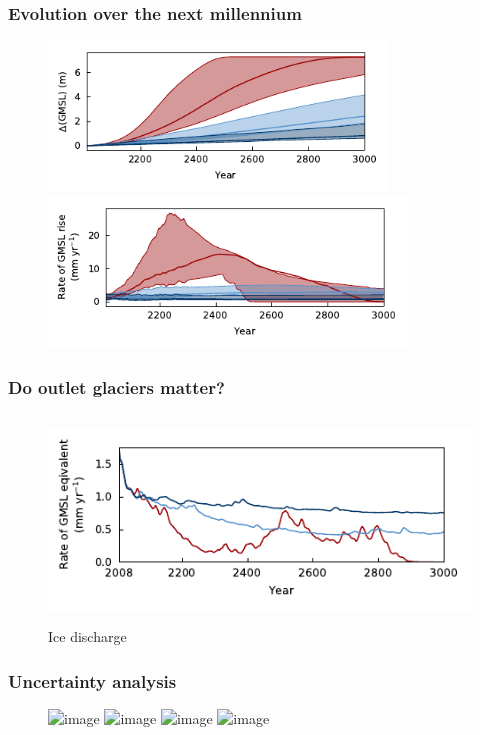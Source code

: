 \documentclass[hide notes,intlimits]{beamer}
\begin{document}
\begin{frame}
  \frametitle{Evolution over the next millennium}
  \begin{figure}
    \includegraphics[height=4cm]{les18_rcp_limnsw} \\
    \includegraphics[height=4cm]{les18_rcp_tendency_of_ice_mass_glacierized}
  \end{figure}
\end{frame}


\begin{frame}
  \frametitle{Do outlet glaciers matter?}
  \begin{figure}
    \includegraphics[height=5.5cm]{rcp_d_rcp_tendency_of_ice_mass_due_to_discharge}
    \caption{Ice discharge}
  \end{figure}
\end{frame}

\begin{frame}
  \frametitle{Uncertainty analysis}
  \begin{figure}
    \includegraphics<1>[height=6.5cm]{gcm_rcp_26_year_2100_les_pie}
    \includegraphics<2>[height=6.5cm]{gcm_rcp_26_year_2200_les_pie}
    \includegraphics<3>[height=6.5cm]{gcm_rcp_26_year_2500_les_pie}
    \includegraphics<4>[height=6.5cm]{gcm_rcp_26_year_3000_les_pie}
  \end{figure}
\end{frame}
\end{document}
